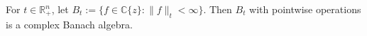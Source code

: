 For $t \in \mathbb{R}_+^n$, let $B_t := \{f \in \mathbb{C}\{z\}: \|f\|_t < \infty\}$. Then $B_t$ with pointwise operations is a complex Banach algebra.
